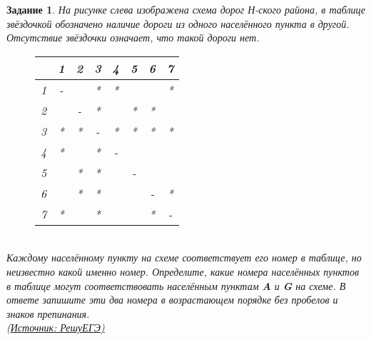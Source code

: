 \documentclass[12pt]{article}
\theoremstyle{problem_style}
\newtheorem{problem}{Задание}[subsection]
\begin{document}
\begin{problem}
На рисунке слева изображена схема дорог Н-ского района, в таблице звёздочкой обозначено наличие дороги из одного населённого пункта в другой. Отсутствие звёздочки означает, что такой дороги нет.
\begin{figure}[h]
    \centering
    \begin{minipage}[t!]{0.45\textwidth}
        \centering
        \begin{tabular}{|c|c|c|c|c|c|c|c|}\hline
        & 1 & 2 & 3 & 4 & 5 & 6 & 7 \\ \hline
        1 & - &  & * & * &  &  & * \\ \hline
        2 &  & - & * &  & * & * &  \\ \hline
        3 & * & * & - & * & * & * & * \\ \hline
        4 & * &  & * & - &  &  &  \\ \hline
        5 &  & * & * &  & - &  &  \\ \hline
        6 &  & * & * &  &  & - & * \\ \hline
        7 & * &  & * &  &  & * & - \\ \hline
        \end{tabular}
    \end{minipage}
    \hfill
    \begin{minipage}[t!]{0.45\textwidth}
        \centering
    \end{minipage}
\end{figure}\\
Каждому населённому пункту на схеме соответствует его номер в таблице, но неизвестно какой именно номер. Определите, какие номера населённых пунктов в таблице могут соответствовать населённым пунктам \textbf{A} и \textbf{G} на схеме. В ответе запишите эти два номера в возрастающем порядке без пробелов и знаков препинания.\\
(\href{https://inf-ege.sdamgia.ru/}{Источник: РешуЕГЭ)} %

\end{problem}
\end{document}
